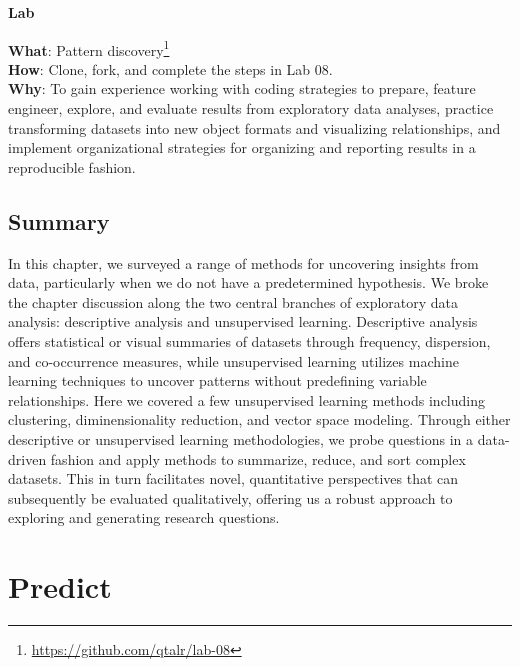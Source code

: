 \documentclass[
  letterpaper,
  DIV=11,
  numbers=noendperiod]{scrreprt}
\theoremstyle{definition}
\theoremstyle{remark}
\DeclareRobustCommand{\href}[2]{#2\footnote{\url{#1}}}
\begin{document}
\begin{tcolorbox}[enhanced jigsaw, leftrule=.75mm, colframe=quarto-callout-color-frame, colback=white, rightrule=.15mm, opacityback=0, arc=.35mm, breakable, bottomrule=.15mm, left=2mm, toprule=.15mm]

\textbf{ Lab}

\textbf{What}: \href{https://github.com/qtalr/lab-08}{Pattern
discovery}\\
\textbf{How}: Clone, fork, and complete the steps in Lab 08.\\
\textbf{Why}: To gain experience working with coding strategies to
prepare, feature engineer, explore, and evaluate results from
exploratory data analyses, practice transforming datasets into new
object formats and visualizing relationships, and implement
organizational strategies for organizing and reporting results in a
reproducible fashion.

\end{tcolorbox}

\section*{Summary}\label{summary-7}


In this chapter, we surveyed a range of methods for uncovering insights
from data, particularly when we do not have a predetermined hypothesis.
We broke the chapter discussion along the two central branches of
exploratory data analysis: descriptive analysis and unsupervised
learning. Descriptive analysis offers statistical or visual summaries of
datasets through frequency, dispersion, and co-occurrence measures,
while unsupervised learning utilizes machine learning techniques to
uncover patterns without predefining variable relationships. Here we
covered a few unsupervised learning methods including clustering,
diminensionality reduction, and vector space modeling. Through either
descriptive or unsupervised learning methodologies, we probe questions
in a data-driven fashion and apply methods to summarize, reduce, and
sort complex datasets. This in turn facilitates novel, quantitative
perspectives that can subsequently be evaluated qualitatively, offering
us a robust approach to exploring and generating research questions.

\chapter{Predict}\label{sec-prediction}
\end{document}

